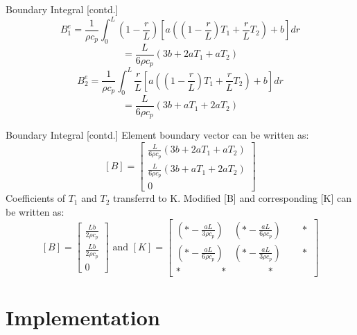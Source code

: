 \documentclass[t,english]{beamer}
\begin{document}
\begin{frame}{Boundary Integral [contd.]}
$$B_1^e = \frac{1}{\rho c_p} \int_0^L (1-\frac{r}{L})[a ((1-\frac{r}{L})T_1 + \frac{r}{L}T_2 ) + b]dr$$ $$= \frac{L}{6 \rho c_p}(3b + 2aT_1 + aT_2)$$
$$B_2^e = \frac{1}{\rho c_p} \int_0^L \frac{r}{L}[a ((1-\frac{r}{L})T_1 + \frac{r}{L}T_2 ) + b]dr $$ $$= \frac{L}{6 \rho c_p}(3b + aT_1 + 2aT_2)$$
\end{frame}

\begin{frame}{Boundary Integral [contd.]}
Element boundary vector can be written as:
$$[B] = \begin{bmatrix}
\frac{L}{6 \rho c_p}(3b + 2aT_1 + aT_2) \\
\frac{L}{6 \rho c_p}(3b + aT_1 + 2aT_2) \\
0
\end{bmatrix}$$
 Coefficients of $T_1$ and $T_2$ transferrd to K. Modified [B] and corresponding [K] can be written as:
$$[B] = \begin{bmatrix}
\frac{Lb}{2 \rho c_p} \\
\frac{Lb}{2 \rho c_p} \\
0
\end{bmatrix} \text{  and  } [K] = \begin{bmatrix}
(\ast - \frac{aL}{3 \rho c_p}) \quad (\ast - \frac{aL}{6 \rho c_p}) \quad \quad \ast \\
(\ast - \frac{aL}{6 \rho c_p}) \quad (\ast - \frac{aL}{3 \rho c_p}) \quad \quad \ast \\
\ast \quad \quad \quad \quad \ast \quad \quad \quad \quad \ast
\end{bmatrix} $$
\end{frame}

\section{Implementation}
\end{document}
